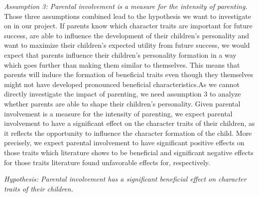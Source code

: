\documentclass[%
    a4paper,            %
    11pt,               %
    bibliography=totoc, %
]
{scrartcl}
\begin{document}
\textit{\centering Assumption 3: Parental involvement is a measure for the intensity of parenting.} \newline \newline
Those three assumptions combined lead to the hypothesis we want to investigate on in our project. If parents know which character traits are important for future success, are able to influence the development of their children’s personality and want to maximize their children’s expected utility from future success, we would expect that parents influence their children's personality formation in a way which goes further than making them similar to themselves. This means that parents will induce the formation of beneficial traits even though they themselves might not have developed pronounced beneficial characteristics.As we cannot directly investigate the impact of parenting, we need assumption 3 to analyze whether parents are able to shape their children's personality. Given parental involvement is a measure for the intensity of parenting, we expect parental involvement to have a significant effect on the character traits of their children, as it reflects the opportunity to influence the character formation of the child. More precisely, we expect parental involvement to have significant positive effects on those traits which literature shows to be beneficial and significant negative effects for those traits literature found unfavorable effects for, respectively.\newline

\textit{\centering Hypothesis: Parental involvement has a significant beneficial effect on character traits of their children.}\newline
\end{document}
